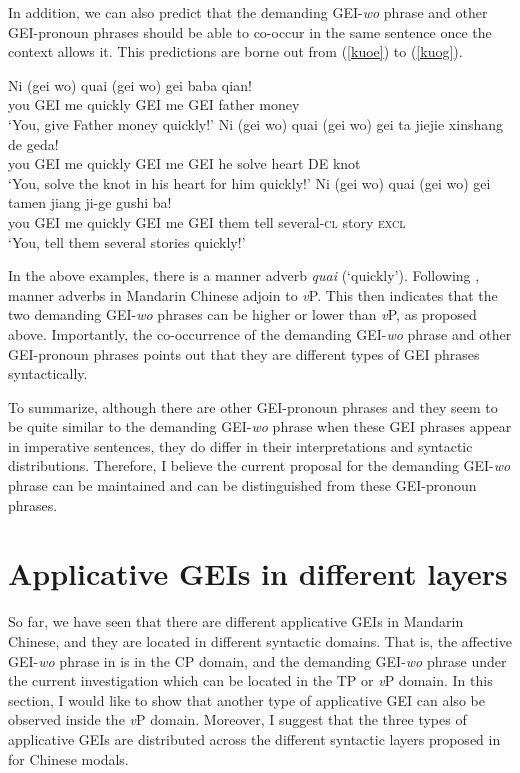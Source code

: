 \documentclass[output=paper,colorlinks,citecolor=brown]{langscibook}
\begin{document}
In addition, we can also predict that the demanding GEI-\textit{wo} phrase and other GEI-pronoun phrases should be able to co-occur in the same sentence once the context allows it. This predictions are borne out from (\ref{kuoe}) to (\ref{kuog}).

\ea
\label{kuoe}
\gll Ni     (gei wo)    quai    (gei wo)    gei baba    qian!\\  
     you     GEI me     quickly  GEI me     GEI father  money\\ 
\glt `You, give Father money quickly!'
\ex
\label{kuof}
\gll Ni     (gei wo)    quai    (gei wo)    gei ta  jiejie  xinshang    de  geda!\\  
     you     GEI me     quickly  GEI me     GEI he  solve   heart       DE  knot\\ 
\glt `You, solve the knot in his heart for him quickly!'
\ex
\label{kuog}
\gll Ni     (gei wo)    quai    (gei wo)    gei tamen   jiang   ji-ge       gushi   ba!\\  
     you     GEI me     quickly  GEI me     GEI them    tell    several-\textsc{cl}  story   \textsc{excl}\\ 
\glt `You, tell them several stories quickly!'
\z

In the above examples, there is a manner adverb \textit{quai} (`quickly'). Following \cite{Tsai2012}, manner adverbs in Mandarin Chinese adjoin to \textit{v}P. This then indicates that the two demanding GEI-\textit{wo} phrases can be higher or lower than \textit{v}P, as proposed above. Importantly, the co-occurrence of the demanding GEI-\textit{wo} phrase and other GEI-pronoun phrases points out that they are different types of GEI phrases syntactically.

To summarize, although there are other GEI-pronoun phrases and they seem to be quite similar to the demanding GEI-\textit{wo} phrase when these GEI phrases appear in imperative sentences, they do differ in their interpretations and syntactic distributions. Therefore, I believe the current proposal for the demanding GEI-\textit{wo} phrase can be maintained and can be distinguished from these GEI-pronoun phrases.

\section{Applicative GEIs in different layers}\label{sect5}

So far, we have seen that there are different applicative GEIs in Mandarin Chinese, and they are located in different syntactic domains. That is, the affective GEI-\textit{wo} phrase in \citet{Tsai2017} is in the CP domain, and the demanding GEI-\textit{wo} phrase under the current investigation which can be located in the TP or \textit{v}P domain. In this section, I would like to show that another type of applicative GEI can also be observed inside the \textit{v}P domain. Moreover, I suggest that the three types of applicative GEIs are distributed across the different syntactic layers proposed in \citet{Tsai2015a} for Chinese modals.
\end{document}
